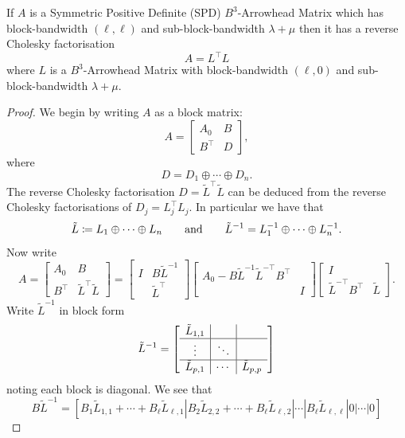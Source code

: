 \documentclass[10pt,a4paper]{amsart}
\def\qqand{\qquad\hbox{and}\qquad}
\begin{document}
\begin{theorem}
If $A$ is a Symmetric Positive Definite (SPD) $B^3$-Arrowhead Matrix which has block-bandwidth $(\ell,\ell)$ and sub-block-bandwidth $\lambda+\mu$ then it has a reverse Cholesky factorisation
\[
	A = L^\top L
\]
where $L$ is a $B^3$-Arrowhead Matrix with block-bandwidth $(\ell,0)$ and sub-block-bandwidth $\lambda+\mu$.
\end{theorem}

\begin{proof}




We begin by writing $A$ as a block matrix:
\[
	A = \begin{bmatrix} 
		A_0 & B \\
		B^\top  & D
	\end{bmatrix},
\]
where
\[
	D = D_1 \oplus \cdots \oplus D_n.
\]
The reverse Cholesky factorisation $D = \tilde L^\top \tilde  L$ can be deduced from the reverse Cholesky factorisations of $D_j = L_j^\top L_j$. In particular we have that
\[
	\tilde  L \coloneqq L_1 \oplus \cdots \oplus L_n \qqand \tilde  L^{-1} = L_1^{-1} \oplus \cdots \oplus L_n^{-1}.
\]
Now write
\[
	A = \begin{bmatrix} 
		A_0 & B \\
		B^\top  & \tilde L^\top  \tilde  L
	\end{bmatrix} = \begin{bmatrix} I & B \tilde L^{-1}  \\ & \tilde  L^\top \end{bmatrix}  \begin{bmatrix} 
		A_0 - B \tilde  L^{-1} \tilde  L^{-\top} B^\top &  \\
		& I
	\end{bmatrix} \begin{bmatrix} I \\  \tilde L^{-\top} B^\top & \tilde L \end{bmatrix}.
\]
Write $\tilde L^{-1}$ in block form
\[
	\tilde L^{-1} = \left[\begin{array}{c | c | c}
		\tilde L_{1,1} && \\
		\hline
		\vdots & \ddots \\
		\hline 
		\tilde L_{p,1}& \cdots & \tilde L_{p,p}
	\end{array}\right]
\]
noting each block is diagonal. We see that
\[
	B \tilde L^{-1} = [B_1 \tilde L_{1,1} + \cdots + B_\ell \tilde L_{\ell,1} | B_2 \tilde L_{2,2} + \cdots + B_\ell \tilde L_{\ell,2} | \cdots | B_\ell \tilde L_{\ell,\ell} | 0 | \cdots | 0 ]
\]
\end{proof}
\end{document}
